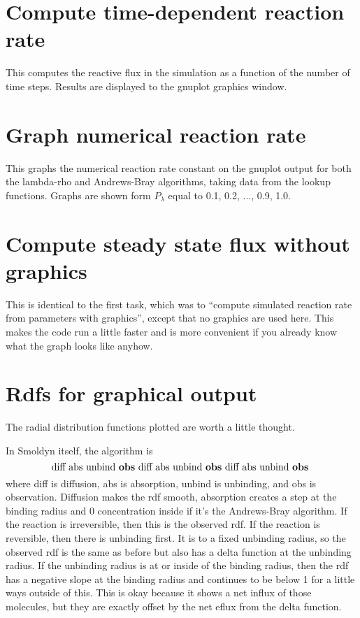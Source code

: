 \documentclass {book}
\begin{document}
\section{Compute time-dependent reaction rate}

This computes the reactive flux in the simulation as a function of the number of time steps. Results are displayed to the gnuplot graphics window.

\section{Graph numerical reaction rate}

This graphs the numerical reaction rate constant on the gnuplot output for both the lambda-rho and Andrews-Bray algorithms, taking data from the lookup functions. Graphs are shown form $P_\lambda$ equal to 0.1, 0.2, ..., 0.9, 1.0.

\section{Compute steady state flux without graphics}

This is identical to the first task, which was to ``compute simulated reaction rate from parameters with graphics'', except that no graphics are used here. This makes the code run a little faster and is more convenient if you already know what the graph looks like anyhow.

\section{Rdfs for graphical output}

The radial distribution functions plotted are worth a little thought.

In Smoldyn itself, the algorithm is
$$\textrm{diff abs unbind \textbf{obs} diff abs unbind \textbf{obs} diff abs unbind \textbf{obs} }$$
where diff is diffusion, abs is absorption, unbind is unbinding, and obs is observation. Diffusion makes the rdf smooth, absorption creates a step at the binding radius and 0 concentration inside if it's the Andrews-Bray algorithm. If the reaction is irreversible, then this is the observed rdf. If the reaction is reversible, then there is unbinding first. It is to a fixed unbinding radius, so the observed rdf is the same as before but also has a delta function at the unbinding radius. If the unbinding radius is at or inside of the binding radius, then the rdf has a negative slope at the binding radius and continues to be below 1 for a little ways outside of this. This is okay because it shows a net influx of those molecules, but they are exactly offset by the net eflux from the delta function.
\end{document}
